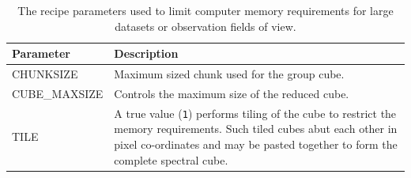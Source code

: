 \documentclass[11pt,oneside,chapters]{starlink}
\begin{document}
\begin{table}[h!]
\begin{small}
\begin{tabular}{|p{6.8cm}|p{8.6cm}|}
\hline
\textbf{Parameter} & \textbf{Description} \\
\hline
CHUNKSIZE & Maximum sized chunk used for the group cube.\\
CUBE\_MAXSIZE & Controls the maximum size of the reduced cube. \\
\hline
TILE & A true value (\texttt{1}) performs tiling of the cube to restrict the memory requirements.
       Such tiled cubes abut each other in pixel co-ordinates and may be pasted together
       to form the complete spectral cube. \\
\hline
\end{tabular}
\end{small}
\caption{\label{tab:largedata_params}
  The recipe parameters used to limit computer memory requirements for large
  datasets or observation fields of view.}
\end{table}
\end{document}
